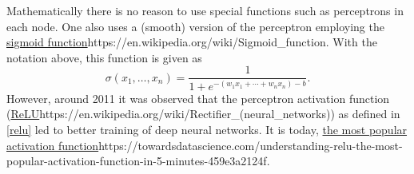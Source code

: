 \documentclass{article}
\begin{document}
  Mathematically there is no reason to use special functions such as perceptrons in each node. One also uses
  a (smooth) version of the perceptron employing the \url{sigmoid function}{https://en.wikipedia.org/wiki/Sigmoid_function}.
  With the notation above, this function is given as
  $$
  \sigma(x_1, \dots, x_n) = \frac{1}{1 + e^{-(w_1 x_1 + \cdots + w_n x_n) - b}}.
  $$
  However, around 2011 it was observed that the perceptron activation function (\url{ReLU}{https://en.wikipedia.org/wiki/Rectifier_(neural_networks)}) as defined in \eqref{relu} led to better training
  of deep neural networks. It is today, \url{the most popular activation function}{https://towardsdatascience.com/understanding-relu-the-most-popular-activation-function-in-5-minutes-459e3a2124f}.
\end{document}

